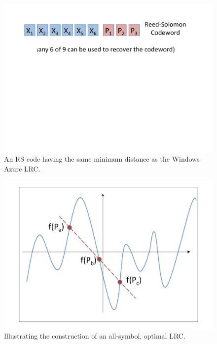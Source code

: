 	\begin{figure}[H]
		\centering
		\includegraphics[scale=.38]{src/Figures/chap4/RS_9_6}  
		\caption{An RS code having the same minimum distance as the Windows Azure LRC.}  \label{fig:RS_9_6}    
	\end{figure}      

\newpage 

	\begin{figure}[H]
		\centering
		\includegraphics[scale=.27]{src/Figures/chap4/tamo_barg_lrc}  
		\caption{Illustrating the construction of an all-symbol, optimal LRC.}  \label{fig:tamo_barg_lrc}    
	\end{figure}

